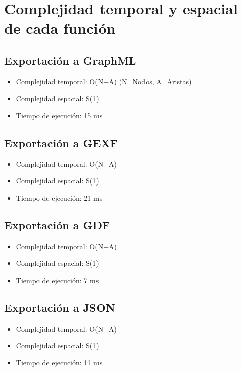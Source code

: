 \documentclass[conference]{IEEEtran}
\begin{document}
\section{Complejidad temporal y espacial de cada función}

\subsection{Exportación a GraphML}
\begin{itemize}
\item Complejidad temporal: O(N+A) (N=Nodos, A=Aristas)
\item Complejidad espacial: S(1)
\item Tiempo de ejecución: 15 ms
\end{itemize}

\subsection{Exportación a GEXF}
\begin{itemize}
\item Complejidad temporal: O(N+A)
\item Complejidad espacial: S(1)
\item Tiempo de ejecución: 21 ms
\end{itemize}

\subsection{Exportación a GDF}
\begin{itemize}
\item Complejidad temporal: O(N+A)
\item Complejidad espacial: S(1)
\item Tiempo de ejecución: 7 ms
\end{itemize}

\subsection{Exportación a JSON}
\begin{itemize}
\item Complejidad temporal: O(N+A)
\item Complejidad espacial: S(1)
\item Tiempo de ejecución: 11 ms
\end{itemize}
\end{document}
